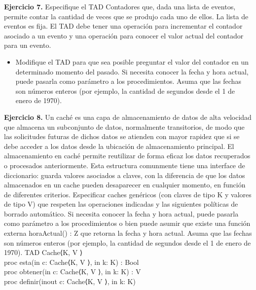 \documentclass{article}
\begin{document}
\textbf{Ejercicio 7.} Especifique el TAD Contadores que, dada una lista de eventos, permite contar la cantidad de veces que se
produjo cada uno de ellos. La lista de eventos es fija. El TAD debe tener una operaci\'on para incrementar el contador asociado
a un evento y una operaci\'on para conocer el valor actual del contador para un evento.
\begin{itemize}
    \item Modifique el TAD para que sea posible preguntar el valor del contador en un determinado momento del pasado. Si necesita conocer la fecha y hora actual, puede pasarla como par\'ametro a los procedimientos. Asuma que las fechas son n\'umeros enteros (por ejemplo, la cantidad de segundos desde el 1 de enero de 1970).
\end{itemize}

\textbf{Ejercicio 8.} Un cach\'e es una capa de almacenamiento de datos de alta velocidad que almacena un subconjunto de datos,
normalmente transitorios, de modo que las solicitudes futuras de dichos datos se atienden con mayor rapidez que si se debe
acceder a los datos desde la ubicaci\'on de almacenamiento principal. El almacenamiento en cach\'e permite reutilizar de forma
eficaz los datos recuperados o procesados anteriormente.
Esta estructura comunmente tiene una interface de diccionario: guarda valores asociados a claves, con la diferencia de
que los datos almacenados en un cache pueden desaparecer en cualquier momento, en funci\'on de diferentes criterios.
Especificar caches gen\'ericos (con claves de tipo K y valores de tipo V) que respeten las operaciones indicadas y las
siguientes pol\'iticas de borrado autom\'atico. Si necesita conocer la fecha y hora actual, puede pasarla como par\'ametro a los
procedimientos o bien puede asumir que existe una funci\'on externa horaActual() : Z que retorna la fecha y hora actual.
Asuma que las fechas son n\'umeros enteros (por ejemplo, la cantidad de segundos desde el 1 de enero de 1970).
\indent TAD Cache⟨K, V ⟩\\
\indent \indent proc esta(in c: Cache⟨K, V ⟩, in k: K) : Bool\\
\indent \indent proc obtener(in c: Cache⟨K, V ⟩, in k: K) : V\\
\indent \indent proc definir(inout c: Cache⟨K, V ⟩, in k: K)
\end{document}
